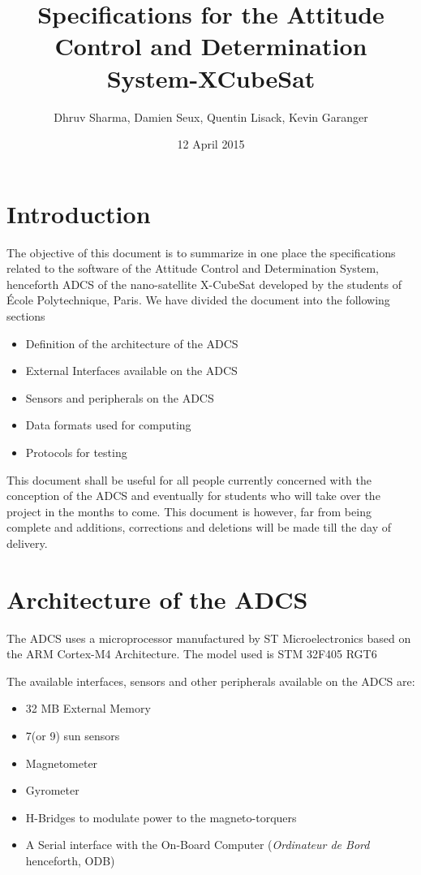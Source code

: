 \documentclass[11pt,a4paper]{report}
\title{Specifications for the Attitude Control and Determination System-XCubeSat}
\author{Dhruv Sharma, Damien Seux, Quentin Lisack, Kevin Garanger}
\date{12 April 2015}
\begin{document}
\maketitle

\tableofcontents

\chapter{Introduction}

The objective of this document is to summarize in one place the specifications related to the software of the Attitude Control and Determination System, henceforth ADCS of the nano-satellite X-CubeSat developed by the students of École Polytechnique, Paris. We have divided the document into the following sections 

\begin{itemize}
\item 
Definition of the architecture of the ADCS 
\item 
External Interfaces available on the ADCS 
\item 
Sensors and peripherals on the ADCS 
\item 
Data formats used for computing 
\item 
Protocols for testing 
\end{itemize}

This document shall be useful for all people currently concerned with the conception of the ADCS and eventually for students who will take over the project in the months to come. This document is however, far from being complete and additions, corrections and deletions will be made till the day of delivery. 

\chapter{Architecture of the ADCS}\thispagestyle{fancy}

The ADCS uses a microprocessor manufactured by ST Microelectronics based on the ARM Cortex-M4 Architecture. The model used is STM 32F405 RGT6

The available interfaces, sensors and other peripherals available on the ADCS are: 

\begin{itemize}
\item 
32 MB External Memory  
\item 
7(or 9) sun sensors 
\item 
Magnetometer
\item 
Gyrometer
\item 
H-Bridges to modulate power to the magneto-torquers 
\item 
A Serial interface with the On-Board Computer (\textit{Ordinateur de Bord} henceforth, ODB) 
\end{itemize}
\end{document}
